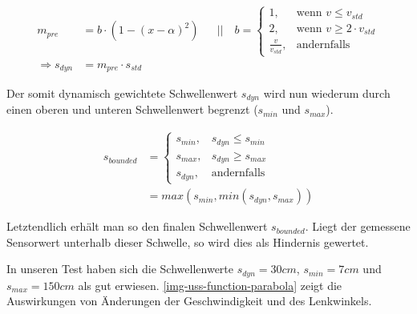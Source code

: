 \documentclass[a4paper,12pt]{report}
\begin{document}
	\begin{align*}
		m_{pre} &= b \cdot \left(1 - \left(x-\alpha\right)^2\right)
		&&||\quad b=
		\begin{cases}
		1,					& \text{wenn } v \leq v_{std} \\
		2,					& \text{wenn } v \geq 2 \cdot v_{std} \\
		\frac{v}{v_{std}}, 	& \text{andernfalls}
		\end{cases}
		\\
		\Rightarrow s_{dyn} &= m_{pre} \cdot s_{std}
	\end{align*}

	Der somit dynamisch gewichtete Schwellenwert $s_{dyn}$ wird nun wiederum durch einen oberen und unteren Schwellenwert begrenzt ($s_{min}$ und $s_{max}$).

	\begin{align*}
		s_{bounded} &=
		\begin{cases}
		s_{min},										& s_{dyn} \leq s_{min} \\
		s_{max},										& s_{dyn} \geq s_{max} \\
		s_{dyn}, 										& \text{andernfalls}
		\end{cases}
		\\
		&= max(s_{min}, min(s_{dyn}, s_{max}))
	\end{align*}

	Letztendlich erhält man so den finalen Schwellenwert $s_{bounded}$.
	Liegt der gemessene Sensorwert unterhalb dieser Schwelle, so wird dies als Hindernis gewertet.
	
	In unseren Test haben sich die Schwellenwerte $s_{dyn} = 30cm$, $s_{min} = 7cm$ und $s_{max} = 150cm$ als gut erwiesen.
	\autoref{img-uss-function-parabola} zeigt die Auswirkungen von Änderungen der Geschwindigkeit und des Lenkwinkels.
	
\end{document}
